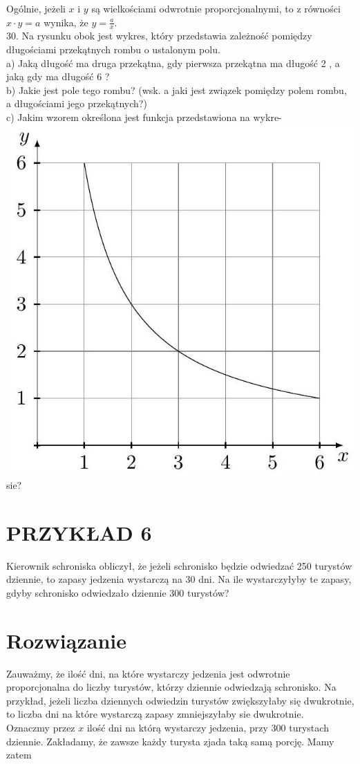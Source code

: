 \documentclass[10pt]{article}
\begin{document}
Ogólnie, jeżeli \(x\) i \(y\) są wielkościami odwrotnie proporcjonalnymi, to z równości \(x \cdot y=a\) wynika, że \(y=\frac{a}{x}\).\\
30. Na rysunku obok jest wykres, który przedstawia zależność pomiędzy długościami przekątnych rombu o ustalonym polu.\\
a) Jaką długość ma druga przekątna, gdy pierwsza przekątna ma długość 2 , a jaką gdy ma długość 6 ?\\
b) Jakie jest pole tego rombu? (wsk. a jaki jest związek pomiędzy polem rombu, a długościami jego przekątnych?)\\
c) Jakim wzorem określona jest funkcja przedstawiona na wykre-\\
\includegraphics[max width=\textwidth, center]{2024_11_21_e9b4faa005d5be2cc318g-136}\\
sie?

\section*{PRZYKŁAD 6}
Kierownik schroniska obliczył, że jeżeli schronisko będzie odwiedzać 250 turystów dziennie, to zapasy jedzenia wystarczą na 30 dni. Na ile wystarczyłyby te zapasy, gdyby schronisko odwiedzało dziennie 300 turystów?

\section*{Rozwiązanie}
Zauważmy, że ilość dni, na które wystarczy jedzenia jest odwrotnie proporcjonalna do liczby turystów, którzy dziennie odwiedzają schronisko. Na przykład, jeżeli liczba dziennych odwiedzin turystów zwiększyłaby się dwukrotnie, to liczba dni na które wystarczą zapasy zmniejszyłaby sie dwukrotnie.\\
Oznaczmy przez \(x\) ilość dni na którą wystarczy jedzenia, przy 300 turystach dziennie. Zakładamy, że zawsze każdy turysta zjada taką samą porcję. Mamy zatem
\end{document}
